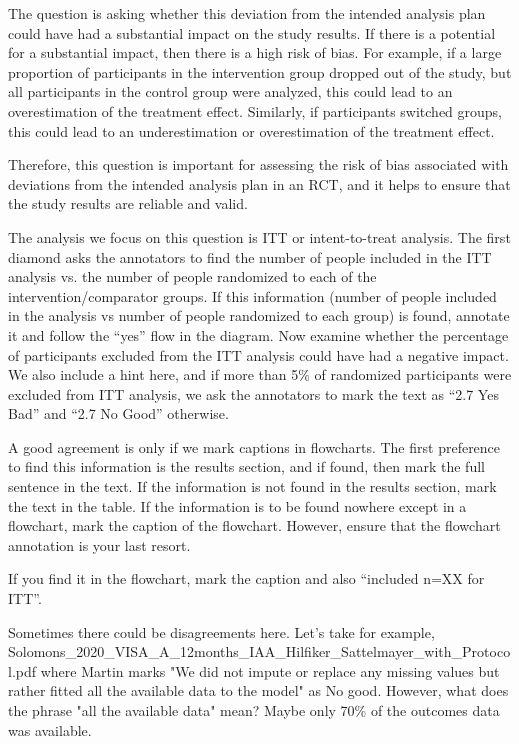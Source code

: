 \documentclass[sn-mathphys,Numbered]{sn-jnl}%
\begin{document}
The question is asking whether this deviation from the intended analysis plan could have had a substantial impact on the study results. If there is a potential for a substantial impact, then there is a high risk of bias. For example, if a large proportion of participants in the intervention group dropped out of the study, but all participants in the control group were analyzed, this could lead to an overestimation of the treatment effect. Similarly, if participants switched groups, this could lead to an underestimation or overestimation of the treatment effect.

Therefore, this question is important for assessing the risk of bias associated with deviations from the intended analysis plan in an RCT, and it helps to ensure that the study results are reliable and valid.


The analysis we focus on this question is ITT or intent-to-treat analysis.
The first diamond asks the annotators to find the number of people included in the ITT analysis vs. the number of people randomized to each of the intervention/comparator groups. 
If this information (number of people included in the analysis vs number of people randomized to each group) is found, annotate it and follow the ``yes'' flow in the diagram.
Now examine whether the percentage of participants excluded from the ITT analysis could have had a negative impact.
We also include a hint here, and if more than 5\% of randomized participants were excluded from ITT analysis, we ask the annotators to mark the text as ``2.7 Yes Bad'' and ``2.7 No Good'' otherwise.

A good agreement is only if we mark captions in flowcharts.
The first preference to find this information is the results section, and if found, then mark the full sentence in the text.
If the information is not found in the results section, mark the text in the table.
If the information is to be found nowhere except in a flowchart, mark the caption of the flowchart.
However, ensure that the flowchart annotation is your last resort.

If you find it in the flowchart, mark the caption and also ``included n=XX for ITT''. %

Sometimes there could be disagreements here. Let's take for example, Solomons\_2020\_VISA\_A\_12months\_IAA\_Hilfiker\_Sattelmayer\_with\_Protocol.pdf where Martin marks "We did not impute or replace any missing values but rather fitted all the available data to the model" as No good. 
However, what does the phrase "all the available data" mean? Maybe only 70\% of the outcomes data was available.
%
%
%
\end{document}
